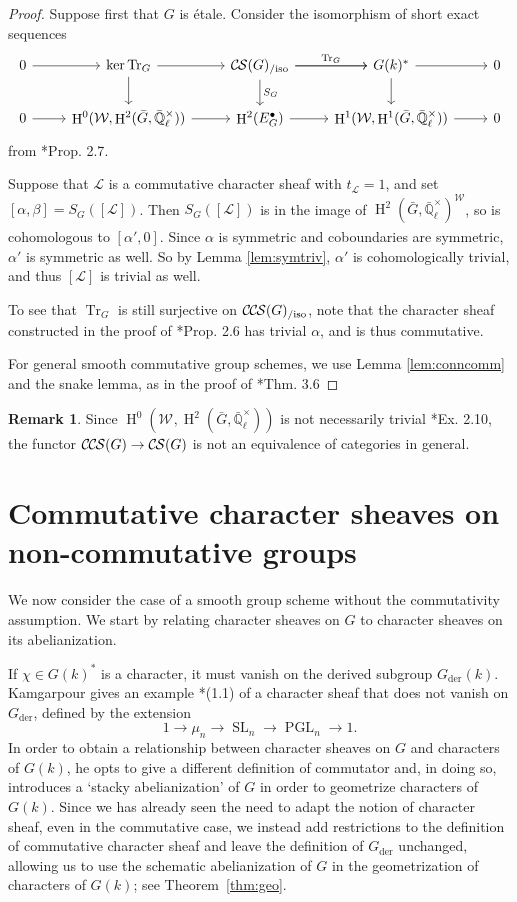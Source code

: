 \documentclass[10pt]{amsart}
\theoremstyle{plain}
\theoremstyle{definition}
\newtheorem{remark}[theorem]{Remark}
\newcommand{\EE}{\mathbb{\bar Q}_\ell}
\newcommand{\Fq}{k}
\newcommand{\EEx}{\EE^\times}
\newcommand{\Weil}[1]{\mathcal{W}_{#1}}
\DeclareMathOperator{\Hh}{H}
\DeclareMathOperator{\SL}{SL}
\DeclareMathOperator{\PGL}{PGL}
\newcommand{\der}{_{\operatorname{der}}}
\newcommand{\trFrob}[1]{t_{#1}}
\newcommand{\TrFrob}[1]{\operatorname{Tr}_{#1}}
\newcommand{\cs}[1]{{\mathcal{#1}}}
\newcommand{\CS}{{\mathcal{C\hskip-0.8pt S}}}
\newcommand{\CCS}{{\mathcal{C\hskip-.8pt C\hskip-0.8pt S}}}
\newcommand{\CSiso}[1]{\CS(#1)_{/\text{iso}}}
\newcommand{\CCSiso}[1]{\CCS(#1)_{/\text{iso}}}
\newcommand{\bG}{\bar{G}}
\begin{document}
\begin{proof}
Suppose first that $G$ is \'etale.  Consider the isomorphism of short exact sequences
\[
\begin{tikzcd}
 0 \arrow{r} & \ker \TrFrob{G} \arrow{d} \arrow{r} & \CSiso{G}\arrow{d}{S_G} \arrow{r}{\TrFrob{G}} \arrow{r} & G(\Fq)^* \arrow{d} \arrow{r} & 0\\
  0 \arrow{r} & \Hh^0(\Weil{},\Hh^2(\bG,\EEx)) \arrow{r} & \Hh^2(E^\bullet_G) \arrow{r} & \Hh^1(\Weil{},\Hh^1(\bG,\EEx)) \arrow{r} & 0
 \end{tikzcd}
 \]
from \cite{cunningham-roe:13a}*{Prop. 2.7}.

Suppose that $\cs{L}$ is a commutative character sheaf with $\trFrob{\cs{L}} = 1$, and set $[\alpha, \beta] = S_G([\cs{L}])$.
Then $S_G([\cs{L}])$ is in the image of $\Hh^2(\bG, \EEx)^\Weil{}$, so is cohomologous to
$[\alpha', 0]$.  Since $\alpha$ is symmetric and coboundaries are symmetric, $\alpha'$ is symmetric as well.
So by Lemma \ref{lem:symtriv}, $\alpha'$ is cohomologically trivial, and thus $[\cs{L}]$ is trivial as well.

To see that $\TrFrob{G}$ is still surjective on $\CCSiso{G}$, note that the character sheaf constructed in the proof of
\cite{cunningham-roe:13a}*{Prop. 2.6} has trivial $\alpha$, and is thus commutative.

For general smooth commutative group schemes, we use Lemma \ref{lem:conncomm} and the snake lemma, as in the proof of
\cite{cunningham-roe:13a}*{Thm. 3.6}
\end{proof}

\begin{remark}
Since $\Hh^0(\Weil{},\Hh^2(\bG,\EEx))$ is not necessarily trivial \cite{cunningham-roe:13a}*{Ex. 2.10}, the functor
$\CCS(G) \to \CS(G)$ is not an equivalence of categories in general.
\end{remark}

\section{Commutative character sheaves on non-commutative groups}\label{sec:noncom}

We now consider the case of a smooth group scheme without the commutativity assumption.  We start
by relating character sheaves on $G$ to character sheaves on its abelianization.

If $\chi \in G(k)^*$ is a character, it must vanish on the derived subgroup $G\der(k)$.
Kamgarpour gives an example \cite{kamgarpour:09a}*{(1.1)} of a character sheaf
that does not vanish on $G\der$, defined by the extension
\[
1 \to \mu_n \to \SL_n \to \PGL_n \to 1.
\]
In order to obtain a relationship between character sheaves on $G$ and characters of $G(k)$,
he opts to give a different definition of commutator and, in doing so, introduces a `stacky abelianization' of $G$ in order to geometrize characters of $G(\Fq)$.
 Since we has already seen the need to adapt the
notion of character sheaf, even in the commutative case, we instead add restrictions
to the definition of commutative character sheaf and leave the definition of $G\der$ unchanged, allowing us to use the schematic abelianization of $G$ in the geometrization of characters of $G(\Fq)$; see Theorem~\ref{thm:geo}.
\end{document}
